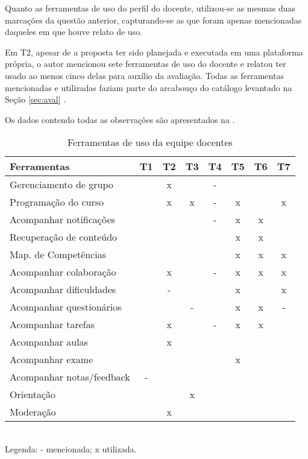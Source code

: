 Quanto as ferramentas de uso do perfil do docente, utilizou-se as mesmas duas marcações da questão anterior, capturando-se as que foram apenas mencionadas daqueles em que houve relato de uso. 

Em T2, apesar de a proposta ter sido planejada e executada em uma plataforma própria, o autor mencionou sete ferramentas de uso do docente e relatou ter usado ao menos cinco delas para auxílio da avaliação. Todas as ferramentas mencionadas e utilizadas faziam parte do arcabouço do catálogo levantado na Seção \ref{sec:aval} .

Os dados contendo todas as observações são apresentados na .

\begin{table}[ht!]
\footnotesize
\caption{Ferramentas de uso da equipe docentes}
\label{tab:Q3}
\centering
\begin{tabular}{|l|c|c|c|c|c|c|c|}
\addlinespace \hline
    \bigstrut \textbf{Ferramentas}&{T1}&{T2}&{T3}&{T4}&{T5}&{T6}&{T7}\\
\hline
    \bigstrut[t]
    Gerenciamento de grupo	& 	& x &   & - &   &   &   \\ \hline
    Programação do curso	&  	& x & x & - & x &   & x \\ \hline
    Acompanhar notificações	& 	&   &   & - & x & x &   \\ \hline
    Recuperação de conteúdo	& 	&   &   &   & x & x &   \\ \hline
    Map. de Competências	& 	&   &   &   & x & x & x \\ \hline       
    Acompanhar colaboração	& 	& x &   & - & x & x & x \\ \hline
    Acompanhar dificuldades	& 	& - &   &   & x &   & x \\ \hline
    Acompanhar questionários& 	&   & - &   & x & x & - \\ \hline    
    Acompanhar tarefas	    & 	& x &   & - & x & x &   \\ \hline
    Acompanhar aulas	    & 	& x &   &   &   &   &   \\ \hline
    Acompanhar exame	    & 	&   &   &   & x &   &   \\ \hline    
    Acompanhar notas/feedback & - & &   &   &   &   &   \\ \hline
    Orientação              &   &   & x &   &   &   &   \\ \hline    
    \bigstrut[b]
    Moderação               & 	& x &   &   &   &   &   \\
\hline
\end{tabular}
\\Legenda: - mencionada; x utilizada.
\end{table}

